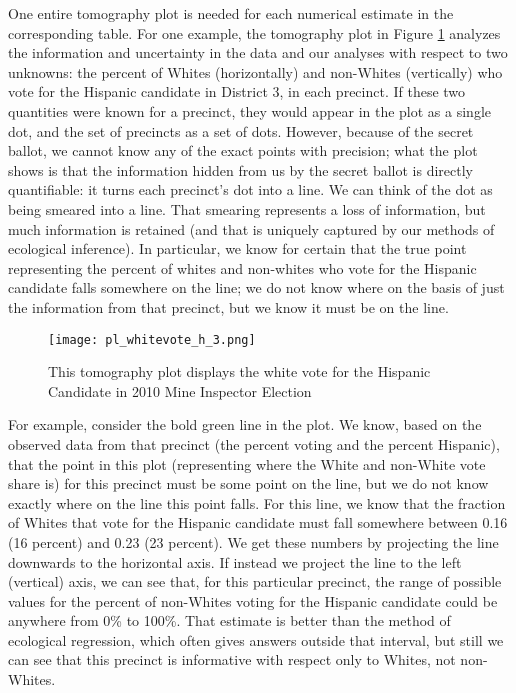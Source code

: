 \documentclass[12pt]{scrartcl}
\begin{document}
One entire tomography plot is needed for each numerical estimate in
the corresponding table. For one example, the tomography plot in
Figure \ref{tomog} analyzes the information and uncertainty in the
data and our analyses with respect to two unknowns: the percent of
Whites (horizontally) and non-Whites (vertically) who vote for the
Hispanic candidate in District 3, in each precinct.  If these two
quantities were known for a precinct, they would appear in the plot as
a single dot, and the set of precincts as a set of dots.  However,
because of the secret ballot, we cannot know any of the exact points
with precision; what the plot shows is that the information hidden
from us by the secret ballot is directly quantifiable: it turns each
precinct's dot into a line.  We can think of the dot as being smeared
into a line. That smearing represents a loss of information, but much
information is retained (and that is uniquely captured by our methods
of ecological inference).  In particular, we know for certain that the
true point representing the percent of whites and non-whites who vote
for the Hispanic candidate falls somewhere on the line; we do not know
where on the basis of just the information from that precinct, but we
know it must be on the line.
\begin{figure}[htb]
\begin{centering}
\texttt{[image: pl\_whitevote\_h\_3.png]}
\caption{This tomography plot displays the white vote for the Hispanic
  Candidate in 2010 Mine Inspector Election}
\end{centering}
\label{tomog}
\end{figure}

For example, consider the bold green line in the plot. We know, based
on the observed data from that precinct (the percent voting and the
percent Hispanic), that the point in this plot (representing where the
White and non-White vote share is) for this precinct must be some
point on the line, but we do not know exactly where on the line this
point falls. For this line, we know that the fraction of Whites that
vote for the Hispanic candidate must fall somewhere between 0.16 (16
percent) and 0.23 (23 percent). We get these numbers by projecting the
line downwards to the horizontal axis. If instead we project the line
to the left (vertical) axis, we can see that, for this particular
precinct, the range of possible values for the percent of non-Whites
voting for the Hispanic candidate could be anywhere from 0\% to 100\%.
That estimate is better than the method of ecological regression,
which often gives answers outside that interval, but still we can see
that this precinct is informative with respect only to Whites, not
non-Whites. 
\end{document}
